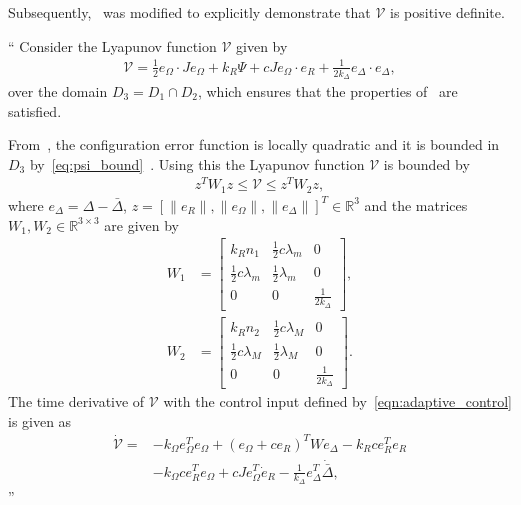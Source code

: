 \documentclass[11pt]{article}
\newcommand{\parenth}[1]{\ensuremath{\left( #1 \right)}}
\newcommand{\R}{\ensuremath{\mathbb{R}}}
\newenvironment{correction}{\begin{list}{}{\setlength{\leftmargin}{1cm}\setlength{\rightmargin}{1cm}}\vspace{\parsep}\item[]``}{''\end{list}}
\begin{document}
\begin{enumerate}
Subsequently,~ was modified to explicitly demonstrate that \( \mathcal{V} \) is positive definite.
\begin{correction}
    Consider the Lyapunov function \( \mathcal{V} \) given by
    \begin{align*}
    \mathcal{V} = \frac{1}{2} e_\Omega \cdot J e_\Omega + k_R \Psi + c J e_\Omega \cdot e_R + \frac{1}{2 k_\Delta} e_\Delta \cdot e_\Delta , %
    \end{align*}
    over the domain \( D_3 = D_1 \cap D_2\), which ensures that the properties of~ are satisfied.

    From~, the configuration error function is locally quadratic and it is bounded in \( D_3 \) by~\cref{eq:psi_bound}~\cite[Definition 6.28]{bullo2004}.
    Using this the Lyapunov function \( \mathcal{V} \) is bounded by
    \begin{align*} %
    z^T W_1 z \leq \mathcal{V} \leq z^T W_2 z ,
    \end{align*}
    where \( e_\Delta = \Delta - \bar{\Delta} \), \( z = [\|e_R\|,\|e_\Omega\|,\|e_\Delta\|]^T\in\R^3 \) and the matrices \(W_1,W_2 \in \R^{3 \times 3}\) are given by
    \begin{align*}
    W_1 & = \begin{bmatrix}
        k_R n_1 & \frac{1}{2} c \lambda_m & 0 \\
        \frac{1}{2} c \lambda_m & \frac{1}{2} \lambda_m & 0 \\
        0 & 0 & \frac{1}{2 k_\Delta}
    \end{bmatrix},\\
    W_2 & = \begin{bmatrix}
        k_R n_2 & \frac{1}{2} c \lambda_M & 0 \\
        \frac{1}{2} c \lambda_M & \frac{1}{2} \lambda_M & 0 \\
        0 & 0 & \frac{1}{2 k_\Delta}
    \end{bmatrix} .
    \end{align*}
    The time derivative of \( \mathcal{V}\) with the control input defined by~\cref{eqn:adaptive_control} is given as
    \begin{align}
    \dot{\mathcal{V}} =& - k_\Omega e_\Omega^T e_\Omega + \parenth{e_\Omega + c e_R}^T W e_\Delta - k_R c e_R^T e_R \nonumber\\
    &- k_\Omega c e_R^T e_\Omega + c J e_\Omega^T \dot{e}_R - \frac{1}{k_\Delta} e_\Delta^T \dot{\bar{\Delta}} , %

\end{align}
\end{correction}
\end{enumerate}
\end{document}
